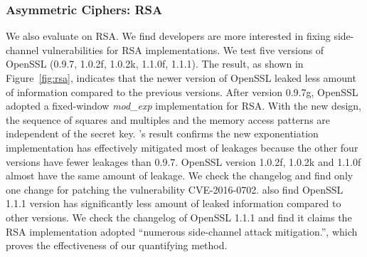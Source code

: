 \subsubsection{Asymmetric Ciphers: RSA}\label{eval:asym}
We also evaluate \tool{} on RSA.  We find developers are more interested in 
fixing side-channel vulnerabilities for RSA implementations. 
We test five versions of OpenSSL (0.9.7, 1.0.2f, 1.0.2k, 1.1.0f, 1.1.1). The
result, as shown in Figure~\ref{fig:rsa}, indicates that the newer
version of OpenSSL leaked less amount of information compared to the previous
versions. After version 0.9.7g, OpenSSL adopted a fixed-window \emph{mod\_exp}
implementation for RSA\@. With the new design, the sequence of squares and
multiples and the memory access patterns are independent of the secret key.
\tool{}'s result confirms the new exponentiation implementation has 
effectively mitigated most of leakages because the other four versions have fewer
leakages than 0.9.7. OpenSSL version 1.0.2f, 1.0.2k and 1.1.0f almost have the
same amount of leakage. We check the changelog and find only one change for
patching the vulnerability CVE-2016-0702. 
\tool{} also find OpenSSL 1.1.1 version has significantly less amount of 
leaked information compared to other versions.
We check the changelog of OpenSSL 1.1.1 and find it claims
the RSA implementation adopted ``numerous side-channel attack mitigation.'', 
which proves the effectiveness of our quantifying method.

